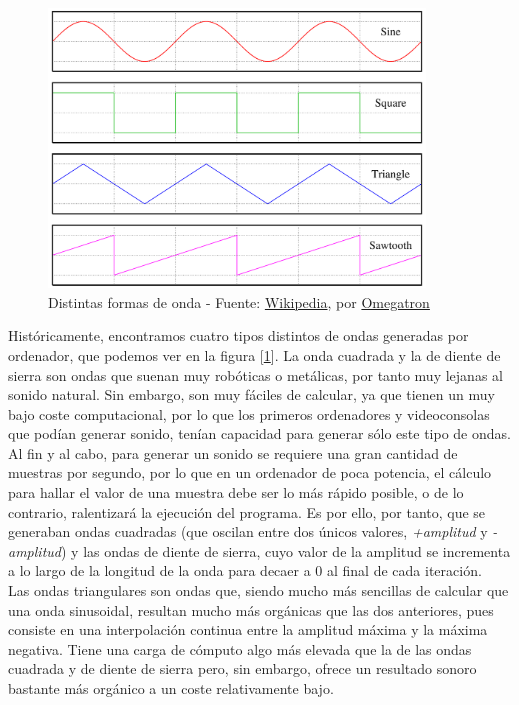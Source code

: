 \begin{figure}[h]
	\centering
	\includegraphics[width=10cm]{archivos/waves}
	\caption{Distintas formas de onda - Fuente: \href{https://upload.wikimedia.org/wikipedia/commons/6/6f/Waveforms.png}{Wikipedia}, por \href{https://commons.wikimedia.org/wiki/User:Omegatron}{Omegatron}}
	\label{fig:waves}
\end{figure}

Históricamente, encontramos cuatro tipos distintos de ondas generadas por ordenador, que podemos ver en la figura [\ref{fig:waves}]. La onda cuadrada y la de diente de sierra son ondas que suenan muy robóticas o metálicas, por tanto muy lejanas al sonido natural. Sin embargo, son muy fáciles de calcular, ya que tienen un muy bajo coste computacional, por lo que los primeros ordenadores y videoconsolas que podían generar sonido, tenían capacidad para generar sólo este tipo de ondas. Al fin y al cabo, para generar un sonido se requiere una gran cantidad de muestras por segundo, por lo que en un ordenador de poca potencia, el cálculo para hallar el valor de una muestra debe ser lo más rápido posible, o de lo contrario, ralentizará la ejecución del programa. Es por ello, por tanto, que se generaban ondas cuadradas (que oscilan entre dos únicos valores, \emph{+amplitud} y \emph{-amplitud}) y las ondas de diente de sierra, cuyo valor de la amplitud se incrementa a lo largo de la longitud de la onda para decaer a 0 al final de cada iteración.\\

Las ondas triangulares son ondas que, siendo mucho más sencillas de calcular que una onda sinusoidal, resultan mucho más orgánicas que las dos anteriores, pues consiste en una interpolación continua entre la amplitud máxima y la máxima negativa. Tiene una carga de cómputo algo más elevada que la de las ondas cuadrada y de diente de sierra pero, sin embargo, ofrece un resultado sonoro bastante más orgánico a un coste relativamente bajo.\\

